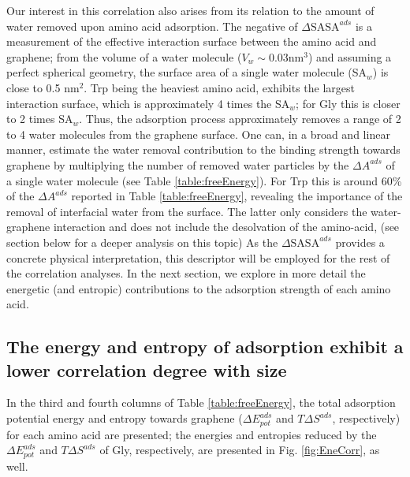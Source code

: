 \documentclass[journal=jcisd8,manuscript=article,layout=twocolumn]{achemso}
\begin{document}
Our interest in this correlation also arises from its relation to the amount of water removed upon amino acid adsorption.
The negative of $\Delta\textrm{SASA}^{ads}$ is a measurement of the effective interaction surface between the amino acid and graphene; from the volume of a water molecule ($V_w\sim0.03\textrm{nm}^3$) and assuming a perfect spherical geometry, the surface area of a single water molecule (SA$_w$) is close to 0.5 nm$^2$.
Trp being the heaviest amino acid, exhibits the largest interaction surface, which is approximately 4 times the SA$_w$; for Gly this is closer to 2 times SA$_w$.
Thus, the adsorption process approximately removes a range of 2 to 4 water molecules from the graphene surface.
One can, in a broad and linear manner, estimate the water removal contribution to the binding strength towards graphene by multiplying the number of removed water particles by the $\Delta A^{ads}$ of a single water molecule (see Table \ref{table:freeEnergy}).
For Trp this is around 60\% of the $\Delta A^{ads}$ reported in Table \ref{table:freeEnergy},  revealing the importance of the removal of interfacial water from the surface. The latter only considers the water-graphene interaction and does not include the desolvation of the amino-acid, (see section below for a deeper analysis on this topic) As the $\Delta\textrm{SASA}^{ads}$ provides a concrete physical interpretation, this descriptor will be employed for the rest of the correlation analyses.
In the next section, we explore in more detail the energetic (and entropic) contributions to the adsorption strength of each amino acid.

\subsection{The energy and entropy of adsorption exhibit a lower correlation degree with size}

In the third and fourth columns of Table \ref{table:freeEnergy}, the total adsorption potential energy and entropy towards graphene ($\Delta E_{pot}^{ads}$ and $T\Delta S^{ads}$, respectively) for each amino acid are presented; the energies and entropies reduced by the $\Delta E_{pot}^{ads}$ and $ T\Delta S^{ads}$ of Gly, respectively, are presented in Fig. \ref{fig:EneCorr}, as well.
\end{document}
